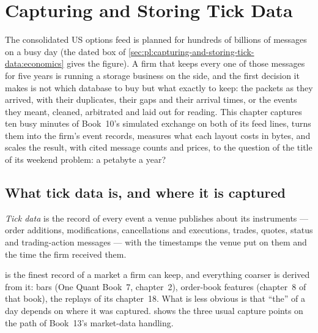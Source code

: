 \chapter{Capturing and Storing Tick Data}\label{ch:pl:capturing-and-storing-tick-data}

The consolidated US options feed is planned for hundreds of billions of messages on a busy day (the dated box of
\cref{sec:pl:capturing-and-storing-tick-data:economics} gives the figure). A firm that keeps every one of those messages for
five years is running a storage business on the side, and the first decision it makes is not which database to buy but what
exactly to keep: the packets as they arrived, with their duplicates, their gaps and their arrival times, or the events they
meant, cleaned, arbitrated and laid out for reading. This chapter captures ten busy minutes of Book~10's simulated exchange
on both of its feed lines, turns them into the firm's event records, measures what each layout costs in bytes, and scales the
result, with cited message counts and prices, to the question of the title of its weekend problem: a petabyte a year?

\section{What tick data is, and where it is captured}

\begin{definition}\label{def:pl:capturing-and-storing-tick-data:tick}
\emph{Tick data} is the record of every event a venue publishes about its instruments --- order additions,
modifications, cancellations and executions, trades, quotes, status and trading-action messages --- with the timestamps the
venue put on them and the time the firm received them.
\end{definition}

 is the finest record of a market a firm can keep, and everything coarser is derived from it: bars (One Quant Book~7,
chapter~2), order-book features (chapter~8 of that book), the replays of its chapter~18. What is less obvious is that ``the''
 of a day depends on where it was captured.  shows the three
usual capture points on the path of Book~13's market-data handling.

